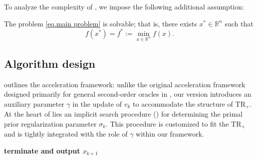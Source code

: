 \documentclass{mcom-l}
\newcommand{\trp}{\textrm{TR}_+}
\numberwithin{equation}{section}
\begin{document}
To analyze the complexity of , we impose the following additional assumption:

\begin{assumption}
    \label{assm.solvable}
    The problem \eqref{eq.main problem} is solvable; that is, there exists $x^* \in \mathbb{R}^n$ such that
    \begin{equation*}
        f(x^*) = f^*:= \min_{x \in \mathbb{R}^n} f(x).
    \end{equation*}
\end{assumption}
\subsection{Algorithm design}
 outlines the acceleration framework: unlike the original acceleration framework designed primarily for general second-order oracles in \citet{monteiro2013accelerated}, our version introduces an auxiliary parameter $\gamma$ in the update of $v_k$ to accommodate the structure of $\trp$. At the heart of  lies an implicit search procedure () for determining the primal prior regularization parameter $\sigma_k$. This procedure is customized to fit the $\trp$ and is tightly integrated with the role of $\gamma$ within our framework.
\begin{algorithm}[ht]
    \caption{Accelerated Trust-Region Extragradient Method~(\atrms{})}\label{alg.ms accelerated utr}
    \begin{algorithmic}[1]
        \STATE \textbf{terminate and output $x_{k+1}$
            \label{line.early terminate ms}
        }
        \ENDIF
        \ENDFOR
    \end{algorithmic}
\end{algorithm}
\end{document}
